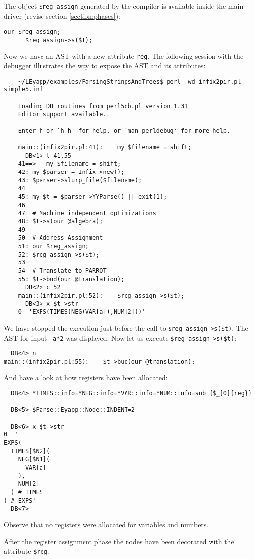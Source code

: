 The  object \verb|$reg_assign|
generated by the compiler is available inside
the main driver (revise section \ref{section:phases}):
\begin{verbatim}
our $reg_assign;
      $reg_assign->s($t);
\end{verbatim}
Now we have an AST  with a new attribute \verb|reg|.
The following session with the debugger illustrates 
the way to expose the AST and its attributes:
\begin{verbatim}
    ~/LEyapp/examples/ParsingStringsAndTrees$ perl -wd infix2pir.pl simple5.inf

    Loading DB routines from perl5db.pl version 1.31
    Editor support available.

    Enter h or `h h' for help, or `man perldebug' for more help.

    main::(infix2pir.pl:41):    my $filename = shift;
      DB<1> l 41,55
    41==>   my $filename = shift;
    42: my $parser = Infix->new(); 
    43: $parser->slurp_file($filename);
    44  
    45: my $t = $parser->YYParse() || exit(1);
    46  
    47  # Machine independent optimizations
    48: $t->s(our @algebra);  
    49  
    50  # Address Assignment 
    51: our $reg_assign;
    52: $reg_assign->s($t);
    53  
    54  # Translate to PARROT
    55: $t->bud(our @translation);
      DB<2> c 52
    main::(infix2pir.pl:52):    $reg_assign->s($t);
      DB<3> x $t->str
    0  'EXPS(TIMES(NEG(VAR[a]),NUM[2]))'
\end{verbatim}
We have stopped the execution just before the 
call to \verb|$reg_assign->s($t)|. The AST
for input \verb|-a*2| was displayed. Now let us execute
\verb|$reg_assign->s($t)|:
\begin{verbatim}
  DB<4> n
main::(infix2pir.pl:55):    $t->bud(our @translation);
\end{verbatim}
And have a look at how registers have been allocated:

\begin{verbatim}
  DB<4> *TIMES::info=*NEG::info=*VAR::info=*NUM::info=sub {$_[0]{reg}}

  DB<5> $Parse::Eyapp::Node::INDENT=2

  DB<6> x $t->str
0  '
EXPS(
  TIMES[$N2](
    NEG[$N1](
      VAR[a]
    ),
    NUM[2]
  ) # TIMES
) # EXPS'
  DB<7> 
\end{verbatim}
Observe that no registers
were allocated for variables and numbers.

After the register assignment phase
the nodes have been decorated with
the attribute \verb|$reg|. 

